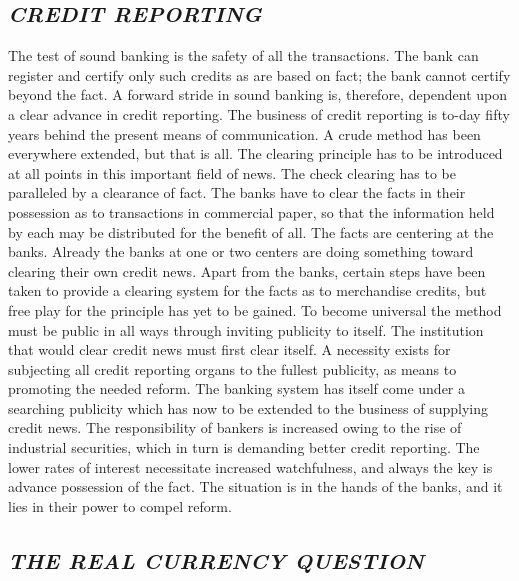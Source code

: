 \documentclass[twoside,symmetric,nobib,justified]{tufte-book}
\begin{document}
\hypertarget{credit-reporting}{%
\subsection{\texorpdfstring{\emph{CREDIT
REPORTING}}{CREDIT REPORTING}}\label{credit-reporting}}

The test of sound banking is the safety of all the transactions. The
bank can register and certify only such credits as are based on fact;
the bank cannot certify beyond the fact. A forward stride in sound
banking is, therefore, dependent upon a clear advance in credit
reporting. The business of credit reporting is to-day fifty years behind
the present means of communication. A crude method has been everywhere
extended, but that is all. The clearing principle has to be introduced
at all points in this important field of news. The check clearing has to
be paralleled by a clearance of fact. The banks have to clear the facts
in their possession as to transactions in commercial paper, so that the
information held by each may be distributed for the benefit of all. The
facts are centering at the banks. Already the banks at one or two
centers are doing something toward clearing their own credit news. Apart
from the banks, certain steps have been taken to provide a clearing
system for the facts as to merchandise credits, but free play for the
principle has yet to be gained. To become universal the method must be
public in all ways through inviting publicity to itself. The institution
that would clear credit news must first clear itself. A necessity exists
for subjecting all credit reporting organs to the fullest publicity, as
means to promoting the needed reform. The banking system has itself come
under a searching publicity which has now to be extended to the business
of supplying credit news. The responsibility of bankers is increased
owing to the rise of industrial securities, which in turn is demanding
better credit reporting. The lower rates of interest necessitate
increased watchfulness, and always the key is advance possession of the
fact. The situation is in the hands of the banks, and it lies in their
power to compel reform. ~~

\hypertarget{the-real-currency-question}{%
\subsection{\texorpdfstring{\emph{THE REAL CURRENCY
QUESTION}}{THE REAL CURRENCY QUESTION}}\label{the-real-currency-question}}
\end{document}
